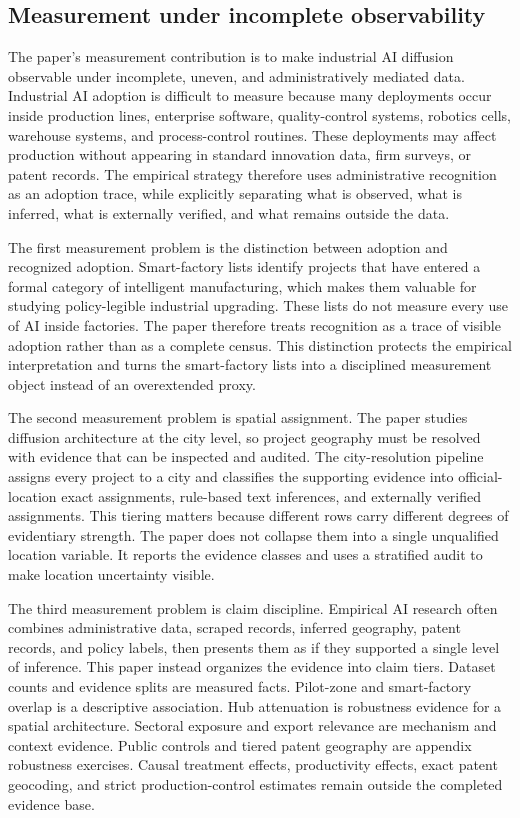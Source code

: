 \subsection{Measurement under incomplete observability}
\label{subsec:measurement_contribution}

The paper's measurement contribution is to make industrial AI diffusion observable under incomplete, uneven, and administratively mediated data. Industrial AI adoption is difficult to measure because many deployments occur inside production lines, enterprise software, quality-control systems, robotics cells, warehouse systems, and process-control routines. These deployments may affect production without appearing in standard innovation data, firm surveys, or patent records. The empirical strategy therefore uses administrative recognition as an adoption trace, while explicitly separating what is observed, what is inferred, what is externally verified, and what remains outside the data.

The first measurement problem is the distinction between adoption and recognized adoption. Smart-factory lists identify projects that have entered a formal category of intelligent manufacturing, which makes them valuable for studying policy-legible industrial upgrading. These lists do not measure every use of AI inside factories. The paper therefore treats recognition as a trace of visible adoption rather than as a complete census. This distinction protects the empirical interpretation and turns the smart-factory lists into a disciplined measurement object instead of an overextended proxy.

The second measurement problem is spatial assignment. The paper studies diffusion architecture at the city level, so project geography must be resolved with evidence that can be inspected and audited. The city-resolution pipeline assigns every project to a city and classifies the supporting evidence into official-location exact assignments, rule-based text inferences, and externally verified assignments. This tiering matters because different rows carry different degrees of evidentiary strength. The paper does not collapse them into a single unqualified location variable. It reports the evidence classes and uses a stratified audit to make location uncertainty visible.

The third measurement problem is claim discipline. Empirical AI research often combines administrative data, scraped records, inferred geography, patent records, and policy labels, then presents them as if they supported a single level of inference. This paper instead organizes the evidence into claim tiers. Dataset counts and evidence splits are measured facts. Pilot-zone and smart-factory overlap is a descriptive association. Hub attenuation is robustness evidence for a spatial architecture. Sectoral exposure and export relevance are mechanism and context evidence. Public controls and tiered patent geography are appendix robustness exercises. Causal treatment effects, productivity effects, exact patent geocoding, and strict production-control estimates remain outside the completed evidence base.

